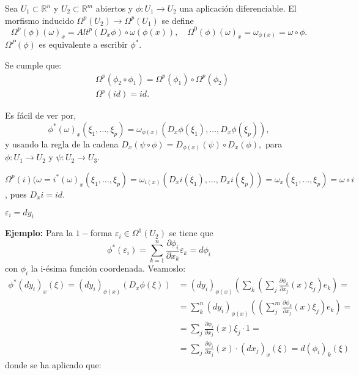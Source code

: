 \begin{Def}
  Sea $U_1\subset \mathbb{R}^n$ y $U_2\subset \mathbb{R}^m$ abiertos y $\phi:U_1\rightarrow U_2$ una aplicación diferenciable. El morfismo inducido $\Omega^p(U_2)\rightarrow \Omega^p(U_1)$ se define
  $$\Omega^p(\phi)(\omega)_x=Alt^p(D_x\phi)\circ \omega(\phi(x)), \quad \Omega^0(\phi)(\omega)_x=\omega_{\phi(x)}=\omega \circ \phi. $$
  $\Omega^P(\phi) $ es equivalente a escribir $\phi^*$.
\end{Def}

Se cumple que:
\begin{equation}
  \begin{split}
    &\Omega^p(\phi_2 \circ \phi_1)=\Omega^p(\phi_1)\circ \Omega^p(\phi_2) \\
    &\Omega^p(id)=id.
  \end{split}
\end{equation}

Es fácil de ver por,
$$\phi^*(\omega)_x(\xi_1,\dots,\xi_p)=\omega_{\phi(x)}(D_x\phi(\xi_1),\dots, D_x\phi(\xi_p)), $$
y usando la regla de la cadena $D_x(\psi \circ \phi)=D_{\phi(x)}(\psi) \circ D_x(\phi),$ para $\phi:U_1\rightarrow U_2$ y $\psi: U_2\rightarrow U_3$.

\begin{nota}
$\Omega^p(i)(\omega=i^*(\omega)_x(\xi_1,\dots, \xi_p)=\omega_{i(x)}(D_xi(\xi_1),\dots,D_xi(\xi_p))=\omega_x(\xi_1,\dots, \xi_p)=\omega\circ i$, pues $D_xi=id$. 
\end{nota}


\begin{nota}
$\varepsilon_i=dy_i$
\end{nota}


\newpage
\textbf{Ejemplo:}  Para la $1-$forma $\varepsilon_i\in \Omega^1(U_2)$ se tiene que
$$\phi^*(\varepsilon_i)=\sum_{k=1}^n \frac{\partial \phi_i}{\partial x_k}\varepsilon_k = d\phi_i $$
con $\phi_i$ la i-ésima función coordenada. Veamoslo:
\begin{equation}
  \begin{split}
    \phi^*(dy_i)_x(\xi)=(dy_i)_{\phi(x)}(D_x\phi(\xi))&=(dy_i)_{\phi(x)} (\sum_k(\sum_j \frac{\partial \phi_k}{\partial x_j}(x) \xi_j)e_k)=\\
    &=\sum_k^n(dy_i)_{\phi(x)}((\sum_j^m\frac{\partial \phi_k}{\partial x_j}(x)\xi_j)e_k)= \\
    &= \sum_j \frac{\partial \phi_i}{\partial x_j}(x)\xi_j \cdot 1 =  \\
    &= \sum_j \frac{\partial \phi_i}{\partial x_j}(x)\cdot (dx_j)_x(\xi)= d(\phi_i)_k(\xi)
  \end{split}    
\end{equation}
donde se ha aplicado que:

